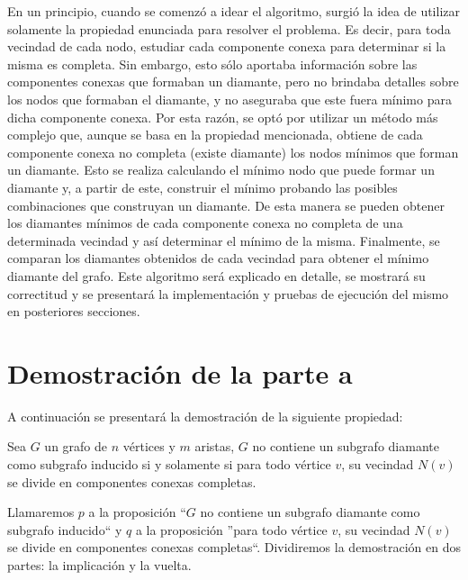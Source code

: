 \documentclass[a4paper,11pt] {article}
\begin{document}
En un principio, cuando se comenz\'o a idear el algoritmo, surgi\'o la idea de utilizar solamente la propiedad enunciada para resolver el problema. Es decir, para toda vecindad de cada nodo, estudiar cada componente conexa para determinar si la misma es completa. Sin embargo, esto s\'olo aportaba informaci\'on sobre las componentes conexas que formaban un diamante, pero no brindaba detalles sobre los nodos que formaban el diamante, y no aseguraba que este fuera m\'inimo para dicha componente conexa. Por esta raz\'on, se opt\'o por utilizar un m\'etodo m\'as complejo que, aunque se basa en la propiedad mencionada, obtiene de cada componente conexa no completa (existe diamante) los nodos m\'inimos que forman un diamante. Esto se realiza calculando el m\'inimo nodo que puede formar un diamante y, a partir de este, construir el m\'inimo probando las posibles combinaciones que construyan un diamante. De esta manera se pueden obtener los diamantes m\'inimos de cada componente conexa no completa de una determinada vecindad y as\'i determinar el m\'inimo de la misma. Finalmente, se comparan los diamantes obtenidos de cada vecindad para obtener el m\'inimo diamante del grafo. Este algoritmo ser\'a explicado en detalle, se mostrar\'a su correctitud y se presentar\'a la implementaci\'on y pruebas de ejecuci\'on del mismo en posteriores secciones.

\section*{Demostraci\'on de la parte a}

A continuaci\'on se presentar\'a la demostraci\'on de la siguiente propiedad:

Sea $G$ un grafo de $n$ v\'ertices y $m$ aristas, $G$ no contiene un subgrafo diamante como subgrafo inducido si y solamente si para todo v\'ertice $v$, su vecindad $N(v)$ se divide en componentes conexas completas.

Llamaremos $p$ a la proposici\'on ``$G$ no contiene un subgrafo diamante como subgrafo inducido`` y $q$ a la proposici\'on ''para todo v\'ertice $v$, su vecindad $N(v)$ se divide en componentes conexas completas``. Dividiremos la demostraci\'on en dos partes: la implicaci\'on y la vuelta.
\end{document}
